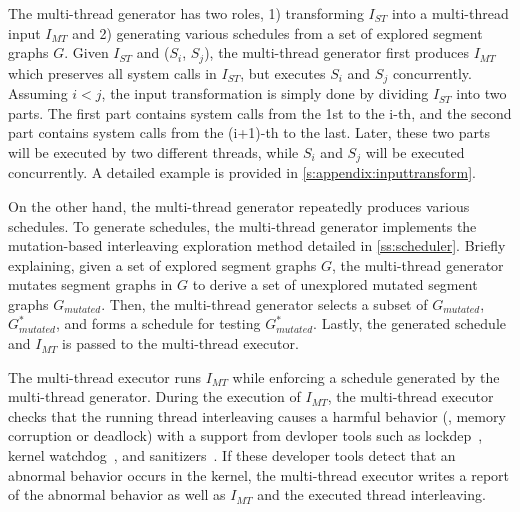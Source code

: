 %
%
%
%
%
The multi-thread generator has two roles, 1) transforming $I_{ST}$
into a multi-thread input $I_{MT}$ and 2) generating various
schedules from a set of explored segment graphs $G$.
%
%   
Given $I_{ST}$ and ($S_i$, $S_j$), the multi-thread generator first
produces $I_{MT}$ which preserves all system calls in $I_{ST}$, but
executes $S_i$ and $S_j$ concurrently.
%
Assuming $i < j$, the input transformation is simply done by dividing
$I_{ST}$ into two parts.
%
The first part contains system calls from the 1st to the i-th, and the
second part contains system calls from the (i+1)-th to the last.
%
Later, these two parts will be executed by two different threads,
while $S_i$ and $S_j$ will be executed concurrently. A detailed
example is provided in \autoref{s:appendix:inputtransform}.



On the other hand, the multi-thread generator repeatedly produces
various schedules.
%
To generate schedules, the multi-thread generator implements the
mutation-based interleaving exploration method detailed in
\autoref{ss:scheduler}.
%
Briefly explaining, given a set of explored segment graphs $G$, the
multi-thread generator mutates segment graphs in $G$ to derive a set
of unexplored mutated segment graphs $G_{mutated}$.
%
Then, the multi-thread generator selects a subset of $G_{mutated}$,
$G^{*}_{mutated}$, and forms a schedule for testing $G^*_{mutated}$.
%
Lastly, the generated schedule and $I_{MT}$ is passed to the
multi-thread executor.






%
The multi-thread executor runs $I_{MT}$ while enforcing a schedule
generated by the multi-thread generator.
%
During the execution of $I_{MT}$, the multi-thread executor checks
that the running thread interleaving causes a harmful behavior (\eg,
memory corruption or deadlock) with a support from devloper tools such
as lockdep~\cite{lockdep}, kernel watchdog~\cite{watchdog}, and
sanitizers~\cite{kasan, ubsan, asan}.
%
If these developer tools detect that an abnormal behavior occurs in
the kernel, the multi-thread executor writes a report of the abnormal
behavior as well as $I_{MT}$ and the executed thread interleaving.







